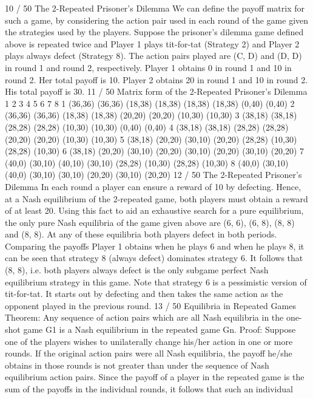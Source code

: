 10 / 50
The 2-Repeated Prisoner’s Dilemma
We can define the payoff matrix for such a game, by considering
the action pair used in each round of the game given the strategies
used by the players.
Suppose the prisoner’s dilemma game defined above is repeated
twice and Player 1 plays tit-for-tat (Strategy 2) and Player 2 plays
always defect (Strategy 8).
The action pairs played are (C, D) and (D, D) in round 1 and
round 2, respectively.
Player 1 obtains 0 in round 1 and 10 in round 2. Her total payoff is
10.
Player 2 obtains 20 in round 1 and 10 in round 2. His total payoff
is 30.
11 / 50
Matrix form of the 2-Repeated Prisoner’s Dilemma
1 2 3 4 5 6 7 8
1 (36,36) (36,36) (18,38) (18,38) (18,38) (18,38) (0,40) (0,40)
2 (36,36) (36,36) (18,38) (18,38) (20,20) (20,20) (10,30) (10,30)
3 (38,18) (38,18) (28,28) (28,28) (10,30) (10,30) (0,40) (0,40)
4 (38,18) (38,18) (28,28) (28,28) (20,20) (20,20) (10,30) (10,30)
5 (38,18) (20,20) (30,10) (20,20) (28,28) (10,30) (28,28) (10,30)
6 (38,18) (20,20) (30,10) (20,20) (30,10) (20,20) (30,10) (20,20)
7 (40,0) (30,10) (40,10) (30,10) (28,28) (10,30) (28,28) (10,30)
8 (40,0) (30,10) (40,0) (30,10) (30,10) (20,20) (30,10) (20,20)
12 / 50
The 2-Repeated Prisoner’s Dilemma
In each round a player can ensure a reward of 10 by defecting.
Hence, at a Nash equilibrium of the 2-repeated game, both players
must obtain a reward of at least 20.
Using this fact to aid an exhaustive search for a pure equilibrium,
the only pure Nash equilibria of the game given above are (6, 6),
(6, 8), (8, 8) and (8, 8). At any of these equilibria both players
defect in both periods.
Comparing the payoffs Player 1 obtains when he plays 6 and when
he plays 8, it can be seen that strategy 8 (always defect) dominates
strategy 6. It follows that (8, 8), i.e. both players always defect is
the only subgame perfect Nash equilibrium strategy in this game.
Note that strategy 6 is a pessimistic version of tit-for-tat. It starts
out by defecting and then takes the same action as the opponent
played in the previous round.
13 / 50
Equilibria in Repeated Games
Theorem: Any sequence of action pairs which are all Nash
equilibria in the one-shot game G1 is a Nash equilibrium in the
repeated game Gn.
Proof: Suppose one of the players wishes to unilaterally change
his/her action in one or more rounds.
If the original action pairs were all Nash equilibria, the payoff
he/she obtains in those rounds is not greater than under the
sequence of Nash equilibrium action pairs.
Since the payoff of a player in the repeated game is the sum of the
payoffs in the individual rounds, it follows that such an individual
